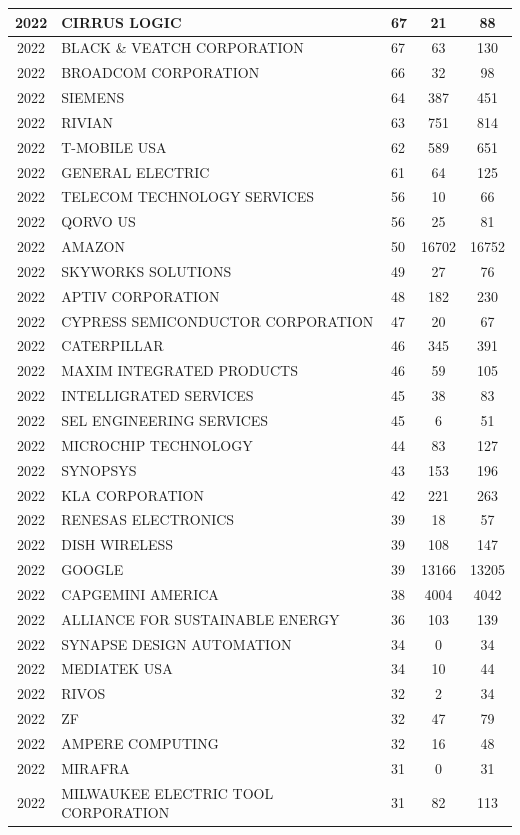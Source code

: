 \documentclass{article}%
\begin{document}
\begin{longtable}{c|p{20em}|p{5em}|c|c}
\hline%
2022&CIRRUS LOGIC&67&21&88\\%
\hline%
2022&BLACK \& VEATCH CORPORATION&67&63&130\\%
\hline%
2022&BROADCOM CORPORATION&66&32&98\\%
\hline%
2022&SIEMENS&64&387&451\\%
\hline%
2022&RIVIAN&63&751&814\\%
\hline%
2022&T{-}MOBILE USA&62&589&651\\%
\hline%
2022&GENERAL ELECTRIC&61&64&125\\%
\hline%
2022&TELECOM TECHNOLOGY SERVICES&56&10&66\\%
\hline%
2022&QORVO US&56&25&81\\%
\hline%
2022&AMAZON&50&16702&16752\\%
\hline%
2022&SKYWORKS SOLUTIONS&49&27&76\\%
\hline%
2022&APTIV CORPORATION&48&182&230\\%
\hline%
2022&CYPRESS SEMICONDUCTOR CORPORATION&47&20&67\\%
\hline%
2022&CATERPILLAR&46&345&391\\%
\hline%
2022&MAXIM INTEGRATED PRODUCTS&46&59&105\\%
\hline%
2022&INTELLIGRATED SERVICES&45&38&83\\%
\hline%
2022&SEL ENGINEERING SERVICES&45&6&51\\%
\hline%
2022&MICROCHIP TECHNOLOGY&44&83&127\\%
\hline%
2022&SYNOPSYS&43&153&196\\%
\hline%
2022&KLA CORPORATION&42&221&263\\%
\hline%
2022&RENESAS ELECTRONICS&39&18&57\\%
\hline%
2022&DISH WIRELESS&39&108&147\\%
\hline%
2022&GOOGLE&39&13166&13205\\%
\hline%
2022&CAPGEMINI AMERICA&38&4004&4042\\%
\hline%
2022&ALLIANCE FOR SUSTAINABLE ENERGY&36&103&139\\%
\hline%
2022&SYNAPSE DESIGN AUTOMATION&34&0&34\\%
\hline%
2022&MEDIATEK USA&34&10&44\\%
\hline%
2022&RIVOS&32&2&34\\%
\hline%
2022&ZF&32&47&79\\%
\hline%
2022&AMPERE COMPUTING&32&16&48\\%
\hline%
2022&MIRAFRA&31&0&31\\%
\hline%
2022&MILWAUKEE ELECTRIC TOOL CORPORATION&31&82&113\\%

\end{longtable}
\end{document}
